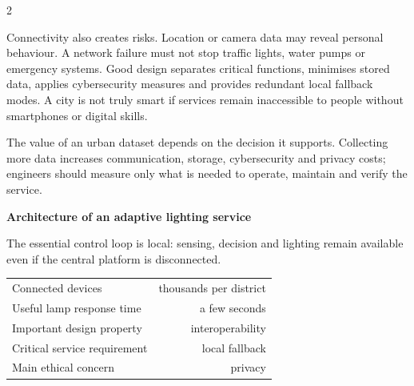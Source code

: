 \begin{multicols}{2}
\begin{ecarticle}
Connectivity also creates risks. Location or camera data may reveal personal behaviour. A network
failure must not stop traffic lights, water pumps or emergency systems. Good design separates
critical functions, minimises stored data, applies cybersecurity measures and provides redundant
local fallback modes. A city is not truly smart if services remain inaccessible to people without
smartphones or digital skills.
\end{ecarticle}

\begin{tcolorbox}[title=\sffamily\bfseries Engineering Insight,colback=yellow!10,colframe=ECOrange]
The value of an urban dataset depends on the decision it supports. Collecting more data increases
communication, storage, cybersecurity and privacy costs; engineers should measure only what is needed
to operate, maintain and verify the service.
\end{tcolorbox}

\begin{engineeringfocus}
\textbf{Architecture of an adaptive lighting service}
\begin{center}
\end{center}
The essential control loop is local: sensing, decision and lighting remain available even if the
central platform is disconnected.
\end{engineeringfocus}

\begin{keyfigures}
\begin{tabularx}{\linewidth}{@{}Xr@{}}
Connected devices & thousands per district\\
Useful lamp response time & a few seconds\\
Important design property & interoperability\\
Critical service requirement & local fallback\\
Main ethical concern & privacy
\end{tabularx}
\end{keyfigures}


\end{multicols}
